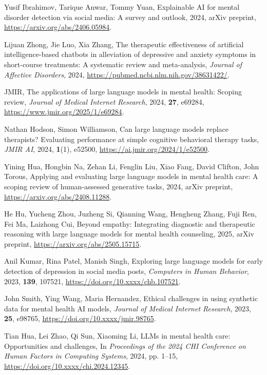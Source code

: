 \documentclass[journal]{IEEEtran}
\begin{document}
\begin{thebibliography}{99}
Yusif Ibrahimov, Tarique Anwar, Tommy Yuan,
Explainable AI for mental disorder detection via social media: A survey and outlook,
2024,
arXiv preprint,
\url{https://arxiv.org/abs/2406.05984}.

Lijuan Zhong, Jie Luo, Xia Zhang,
The therapeutic effectiveness of artificial intelligence-based chatbots in alleviation of depressive and anxiety symptoms in short-course treatments: A systematic review and meta-analysis,
\textit{Journal of Affective Disorders}, 2024,
\url{https://pubmed.ncbi.nlm.nih.gov/38631422/}.

JMIR,
The applications of large language models in mental health: Scoping review,
\textit{Journal of Medical Internet Research}, 2024, \textbf{27}, e69284,
\url{https://www.jmir.org/2025/1/e69284}.

Nathan Hodson, Simon Williamson,
Can large language models replace therapists? Evaluating performance at simple cognitive behavioral therapy tasks,
\textit{JMIR AI}, 2024, \textbf{1}(1), e52500,
\url{https://ai.jmir.org/2024/1/e52500}.

Yining Hua, Hongbin Na, Zehan Li, Fenglin Liu, Xiao Fang, David Clifton, John Torous,
Applying and evaluating large language models in mental health care: A scoping review of human-assessed generative tasks,
2024,
arXiv preprint,
\url{https://arxiv.org/abs/2408.11288}.

He Hu, Yucheng Zhou, Juzheng Si, Qianning Wang, Hengheng Zhang, Fuji Ren, Fei Ma, Laizhong Cui,
Beyond empathy: Integrating diagnostic and therapeutic reasoning with large language models for mental health counseling,
2025,
arXiv preprint,
\url{https://arxiv.org/abs/2505.15715}.

Anil Kumar, Rina Patel, Manish Singh,
Exploring large language models for early detection of depression in social media posts,
\textit{Computers in Human Behavior}, 2023, \textbf{139}, 107521,
\url{https://doi.org/10.xxxx/chb.107521}.

John Smith, Ying Wang, Maria Hernandez,
Ethical challenges in using synthetic data for mental health AI models,
\textit{Journal of Medical Internet Research}, 2023, \textbf{25}, e98765,
\url{https://doi.org/10.xxxx/jmir.98765}.

Tian Hua, Lei Zhao, Qi Sun, Xiaoming Li,
LLMs in mental health care: Opportunities and challenges,
In \textit{Proceedings of the 2024 CHI Conference on Human Factors in Computing Systems}, 2024, pp. 1--15,
\url{https://doi.org/10.xxxx/chi.2024.12345}.


\end{thebibliography}
\end{document}

